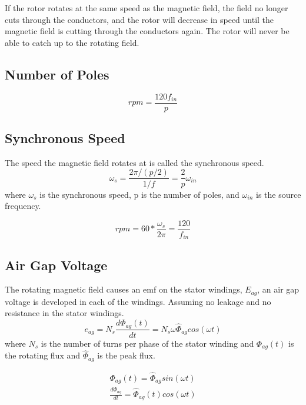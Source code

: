 \documentclass{article}
\begin{document}
    If the rotor rotates at the same speed as the magnetic field, the field no longer cuts through the conductors, and the rotor will decrease in 
    speed until the magnetic field is cutting through the conductors again. The rotor will never be able to catch up to the 
    rotating field.

    \subsection*{Number of Poles}
        \begin{equation*}
            rpm = \frac{120f_{in}}{p}
        \end{equation*}

    \subsection*{Synchronous Speed}
    The speed the magnetic field rotates at is called the synchronous speed.
        \begin{equation*}
            \omega_{s} = \frac{2\pi  / (p/2)}{1/f} = \frac{2}{p} \omega_{in}
        \end{equation*}
        where $\omega_{s}$ is the synchronous speed, p is the number of poles, and $\omega_{in}$ is the source frequency.

        \begin{equation*}
            rpm = 60 * \frac{\omega_{s}}{2\pi } = \frac{120}{f_{in}}
        \end{equation*}

    \subsection*{Air Gap Voltage}
    The rotating magnetic field causes an emf on the stator windings, $E_{ag}$, an air gap voltage is developed 
    in each of the windings. Assuming no leakage and no resistance in the stator windings.
    \begin{equation*}
        e_{ag} = N_{s} \frac{d \Phi_{ag}(t)}{dt} = N_{s} \omega \hat{\Phi}_{ag} cos( \omega t)
    \end{equation*}
    where $N_{s}$ is the number of turns per phase of the stator winding and $\Phi_{ag}(t)$ is the rotating flux and 
    $\hat{\Phi}_{ag}$ is the peak flux.

    \begin{align*}
        \Phi_{ag}(t) = \hat{\Phi}_{ag} sin(\omega t)\\
        \frac{d\Phi_{ag}}{dt} = \hat{\Phi}_{ag}(t) cos(\omega t)
    \end{align*}
\end{document}
